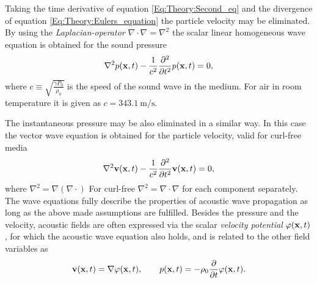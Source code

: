 %
Taking the time derivative of equation \ref{Eq:Theory:Second_eq} and the divergence of equation \ref{Eq:Theory:Eulers_equation} the particle velocity may be eliminated. By using the \emph{Laplacian-operator} $\nabla \cdot \nabla = \nabla^2$ the scalar linear homogeneous wave equation is obtained for the sound pressure
\begin{equation}
\nabla^2 p(\mathbf{x},t) - \frac{1}{c^2} \frac{\partial^2}{\partial t^2} p(\mathbf{x},t) = 0,
\label{Eq:Theory:Scalar_wave_equation}
\end{equation}
%
%
where $c \equiv \sqrt{ \frac{\gamma P_0}{\rho_0} }$ is the speed of the sound wave in the medium. For air in room temperature it is given as $c = 343.1 ~ \mathrm{m}/\mathrm{s}$.

The instantaneous pressure may be also eliminated in a similar way. In this case the vector wave equation is obtained for the particle velocity, valid for curl-free media
\begin{equation}
\nabla^2 \mathbf{v}(\mathbf{x},t) - \frac{1}{c^2} \frac{\partial^2}{\partial t^2} \mathbf{v}(\mathbf{x},t) = 0,
\label{Eq:Theory:Vector_wave_equation}
\end{equation}
where $\nabla^2 = \nabla \left( \nabla \cdot \right)$ {\color{red}For curl-free $\nabla^2 = \nabla \cdot \nabla$ for each component separately}.
%
The wave equations fully describe the properties of acoustic wave propagation as long as the above made assumptions are fulfilled.
Besides the pressure and the velocity, acoustic fields are often expressed via the scalar \emph{velocity potential} $\varphi(\mathbf{x},t)$, for which the acoustic wave equation also holds, and is related to the other field variables as 
\begin{equation}
\mathbf{v}(\mathbf{x},t) = \nabla \varphi(\mathbf{x},t), \hspace{7mm} p(\mathbf{x},t) = -\rho_0 \frac{\partial}{\partial t} \varphi(\mathbf{x},t).
\label{eq:theory:velocity_potential_definition}
\end{equation}
%


